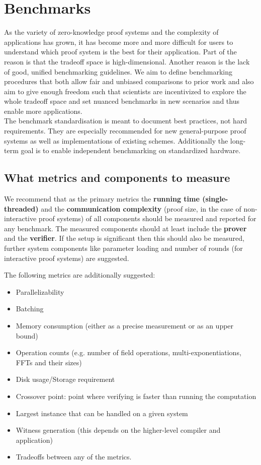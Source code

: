 \section{Benchmarks}
\label{implem:benchmarks}

As the variety of zero-knowledge proof systems and the complexity of applications has grown, it has become more and more difficult for users to understand which proof system is the best for their application. Part of the reason is that the tradeoff space is high-dimensional. Another reason is the lack of good, unified benchmarking guidelines. We aim to define benchmarking procedures that both allow fair and unbiased comparisons to prior work and also aim to give enough freedom such that scientists are incentivized to explore the whole tradeoff space and set nuanced benchmarks in new scenarios and thus enable more applications.\\
The benchmark standardisation is meant to document best practices, not hard requirements. They are especially recommended for new general-purpose proof systems as well as implementations of existing schemes. Additionally the long-term goal is to enable independent benchmarking on standardized hardware.


\subsection{What metrics and components to measure}

We recommend that as the primary metrics the \textbf{running time (single-threaded)} and the \textbf{communication complexity} (proof size, in the case of non-interactive proof systems) of all components should be measured and reported for any benchmark. The measured components should at least include the \textbf{prover} and the \textbf{verifier}. If the setup is significant then this should also be measured, further system components like parameter loading and number of rounds (for interactive proof systems) are suggested.

The following metrics are additionally suggested:
\begin{itemize}[label={- }]
\item Parallelizability
\item Batching
\item Memory consumption (either as a precise measurement or as an upper bound)
\item Operation counts (e.g. number of field operations, multi-exponentiations, FFTs and their sizes)
\item Disk usage/Storage requirement
\item Crossover point: point where verifying is faster than running the computation
\item Largest instance that can be handled on a given system
\item Witness generation (this depends on the higher-level compiler and application)
\item Tradeoffs between any of the metrics.
\end{itemize}



